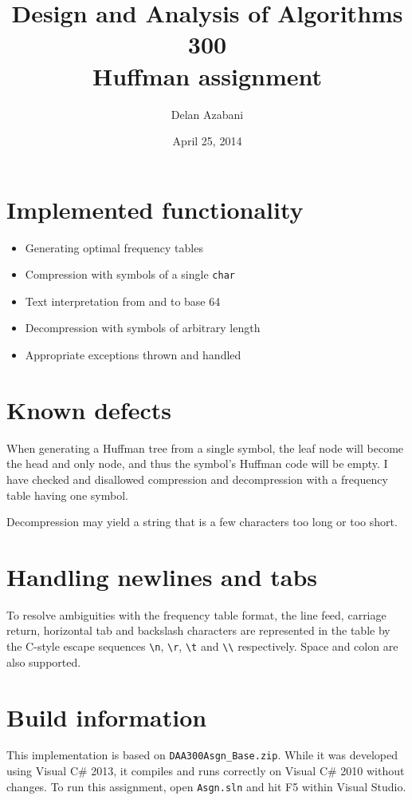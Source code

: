 \documentclass[a4paper,12pt]{article}
\title{Design and Analysis of Algorithms 300\\Huffman assignment}
\date{April 25, 2014}
\author{Delan Azabani}
\begin{document}
\maketitle

\section{Implemented functionality}

\begin{itemize}
	\item Generating optimal frequency tables
	\item Compression with symbols of a single \texttt{char}
	\item Text interpretation from and to base 64
	\item Decompression with symbols of arbitrary length
	\item Appropriate exceptions thrown and handled
\end{itemize}

\section{Known defects}

When generating a Huffman tree from a single symbol, the leaf node will become
the head and only node, and thus the symbol's Huffman code will be empty. I
have checked and disallowed compression and decompression with a frequency
table having one symbol.

Decompression may yield a string that is a few characters too long or too
short.

\section{Handling newlines and tabs}

To resolve ambiguities with the frequency table format, the line feed, carriage
return, horizontal tab and backslash characters are represented in the table by
the C-style escape sequences
\texttt{\textbackslash n},
\texttt{\textbackslash r},
\texttt{\textbackslash t} and
\texttt{\textbackslash\textbackslash} respectively.
Space and colon are also supported.

\section{Build information}

This implementation is based on \texttt{DAA300Asgn\_Base.zip}. While it was
developed using Visual C\# 2013, it compiles and runs correctly on Visual C\#
2010 without changes. To run this assignment, open \texttt{Asgn.sln} and hit F5
within Visual Studio.
\end{document}
